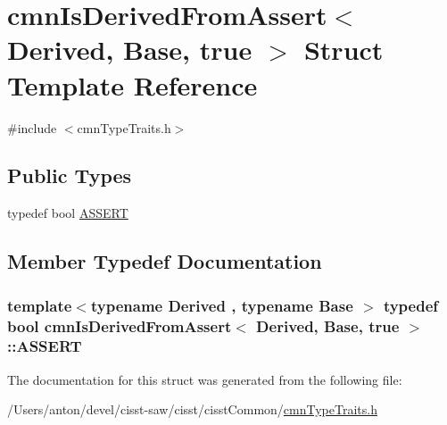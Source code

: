 \hypertarget{structcmn_is_derived_from_assert_3_01_derived_00_01_base_00_01true_01_4}{}\section{cmn\+Is\+Derived\+From\+Assert$<$ Derived, Base, true $>$ Struct Template Reference}
\label{structcmn_is_derived_from_assert_3_01_derived_00_01_base_00_01true_01_4}


{\ttfamily \#include $<$cmn\+Type\+Traits.\+h$>$}

\subsection*{Public Types}
\begin{DoxyCompactItemize}
\item 
typedef bool \hyperlink{structcmn_is_derived_from_assert_3_01_derived_00_01_base_00_01true_01_4_a545af271f5b245790db2277f5ca2fc01}{A\+S\+S\+E\+R\+T}
\end{DoxyCompactItemize}


\subsection{Member Typedef Documentation}
\hypertarget{structcmn_is_derived_from_assert_3_01_derived_00_01_base_00_01true_01_4_a545af271f5b245790db2277f5ca2fc01}{}
\subsubsection[{A\+S\+S\+E\+R\+T}]{\setlength{\rightskip}{0pt plus 5cm}template$<$typename Derived , typename Base $>$ typedef bool {\bf cmn\+Is\+Derived\+From\+Assert}$<$ Derived, Base, true $>$\+::{\bf A\+S\+S\+E\+R\+T}}\label{structcmn_is_derived_from_assert_3_01_derived_00_01_base_00_01true_01_4_a545af271f5b245790db2277f5ca2fc01}


The documentation for this struct was generated from the following file\+:\begin{DoxyCompactItemize}
\item 
/\+Users/anton/devel/cisst-\/saw/cisst/cisst\+Common/\hyperlink{cmn_type_traits_8h}{cmn\+Type\+Traits.\+h}\end{DoxyCompactItemize}
